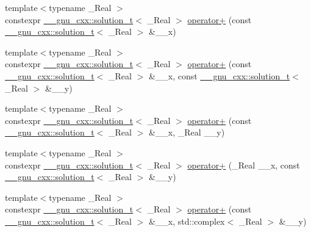\begin{DoxyCompactItemize}
\item 
{\footnotesize template$<$typename \+\_\+\+Real $>$ }\\constexpr \hyperlink{namespace____gnu__cxx_ae20ea642de50eb361074c62676b0159c}{\+\_\+\+\_\+gnu\+\_\+cxx\+::solution\+\_\+t}$<$ \+\_\+\+Real $>$ \hyperlink{namespacestd_a49a4eaaa2e023275443b1854bc90c77d}{operator+} (const \hyperlink{namespace____gnu__cxx_ae20ea642de50eb361074c62676b0159c}{\+\_\+\+\_\+gnu\+\_\+cxx\+::solution\+\_\+t}$<$ \+\_\+\+Real $>$ \&\+\_\+\+\_\+x)
\item 
{\footnotesize template$<$typename \+\_\+\+Real $>$ }\\constexpr \hyperlink{namespace____gnu__cxx_ae20ea642de50eb361074c62676b0159c}{\+\_\+\+\_\+gnu\+\_\+cxx\+::solution\+\_\+t}$<$ \+\_\+\+Real $>$ \hyperlink{namespacestd_ad34e888e243a1ad8303966f3cfe7a690}{operator+} (const \hyperlink{namespace____gnu__cxx_ae20ea642de50eb361074c62676b0159c}{\+\_\+\+\_\+gnu\+\_\+cxx\+::solution\+\_\+t}$<$ \+\_\+\+Real $>$ \&\+\_\+\+\_\+x, const \hyperlink{namespace____gnu__cxx_ae20ea642de50eb361074c62676b0159c}{\+\_\+\+\_\+gnu\+\_\+cxx\+::solution\+\_\+t}$<$ \+\_\+\+Real $>$ \&\+\_\+\+\_\+y)
\item 
{\footnotesize template$<$typename \+\_\+\+Real $>$ }\\constexpr \hyperlink{namespace____gnu__cxx_ae20ea642de50eb361074c62676b0159c}{\+\_\+\+\_\+gnu\+\_\+cxx\+::solution\+\_\+t}$<$ \+\_\+\+Real $>$ \hyperlink{namespacestd_a57af80492f51cac0e5c9cde7ea2ca845}{operator+} (const \hyperlink{namespace____gnu__cxx_ae20ea642de50eb361074c62676b0159c}{\+\_\+\+\_\+gnu\+\_\+cxx\+::solution\+\_\+t}$<$ \+\_\+\+Real $>$ \&\+\_\+\+\_\+x, \+\_\+\+Real \+\_\+\+\_\+y)
\item 
{\footnotesize template$<$typename \+\_\+\+Real $>$ }\\constexpr \hyperlink{namespace____gnu__cxx_ae20ea642de50eb361074c62676b0159c}{\+\_\+\+\_\+gnu\+\_\+cxx\+::solution\+\_\+t}$<$ \+\_\+\+Real $>$ \hyperlink{namespacestd_a6f47cf71b7277a461d5627a46748abe1}{operator+} (\+\_\+\+Real \+\_\+\+\_\+x, const \hyperlink{namespace____gnu__cxx_ae20ea642de50eb361074c62676b0159c}{\+\_\+\+\_\+gnu\+\_\+cxx\+::solution\+\_\+t}$<$ \+\_\+\+Real $>$ \&\+\_\+\+\_\+y)
\item 
{\footnotesize template$<$typename \+\_\+\+Real $>$ }\\constexpr \hyperlink{namespace____gnu__cxx_ae20ea642de50eb361074c62676b0159c}{\+\_\+\+\_\+gnu\+\_\+cxx\+::solution\+\_\+t}$<$ \+\_\+\+Real $>$ \hyperlink{namespacestd_a7c7a048cefad54d71198cecef43ff7bd}{operator+} (const \hyperlink{namespace____gnu__cxx_ae20ea642de50eb361074c62676b0159c}{\+\_\+\+\_\+gnu\+\_\+cxx\+::solution\+\_\+t}$<$ \+\_\+\+Real $>$ \&\+\_\+\+\_\+x, std\+::complex$<$ \+\_\+\+Real $>$ \&\+\_\+\+\_\+y)

\end{DoxyCompactItemize}
